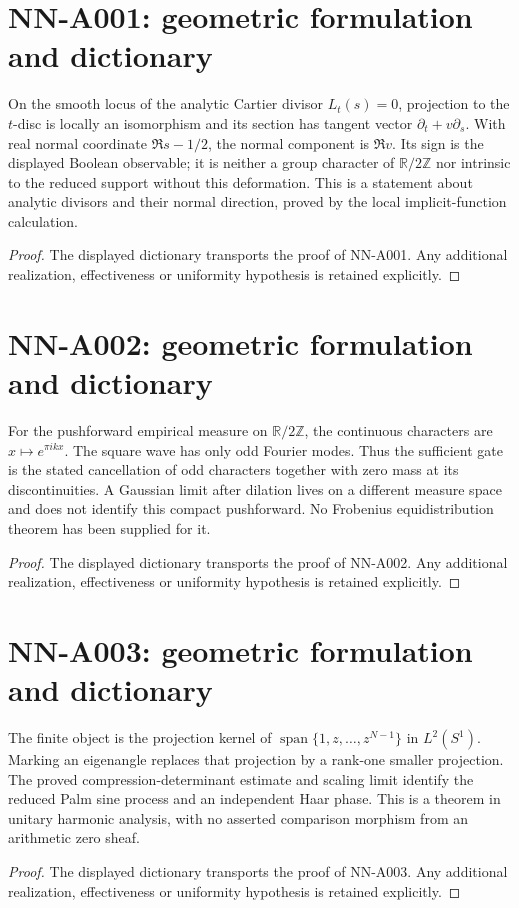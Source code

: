 \section{NN-A001: geometric formulation and dictionary}
\begin{geometricstatement}[NN-A001]
On the smooth locus of the analytic Cartier divisor $L_t(s)=0$, projection to the $t$-disc is locally an isomorphism and its section has tangent vector $\partial_t+v\partial_s$. With real normal coordinate $\Re s-1/2$, the normal component is $\Re v$. Its sign is the displayed Boolean observable; it is neither a group character of $\mathbb R/2\mathbb Z$ nor intrinsic to the reduced support without this deformation. This is a statement about analytic divisors and their normal direction, proved by the local implicit-function calculation.
\end{geometricstatement}
\begin{proof} The displayed dictionary transports the proof of NN-A001. Any additional realization, effectiveness or uniformity hypothesis is retained explicitly.\end{proof}


\section{NN-A002: geometric formulation and dictionary}
\begin{geometricstatement}[NN-A002]
For the pushforward empirical measure on $\mathbb R/2\mathbb Z$, the continuous characters are $x\mapsto e^{\pi ikx}$. The square wave has only odd Fourier modes. Thus the sufficient gate is the stated cancellation of odd characters together with zero mass at its discontinuities. A Gaussian limit after dilation lives on a different measure space and does not identify this compact pushforward. No Frobenius equidistribution theorem has been supplied for it.
\end{geometricstatement}
\begin{proof} The displayed dictionary transports the proof of NN-A002. Any additional realization, effectiveness or uniformity hypothesis is retained explicitly.\end{proof}


\section{NN-A003: geometric formulation and dictionary}
\begin{geometricstatement}[NN-A003]
The finite object is the projection kernel of $\operatorname{span}\{1,z,\ldots,z^{N-1}\}$ in $L^2(S^1)$. Marking an eigenangle replaces that projection by a rank-one smaller projection. The proved compression-determinant estimate and scaling limit identify the reduced Palm sine process and an independent Haar phase. This is a theorem in unitary harmonic analysis, with no asserted comparison morphism from an arithmetic zero sheaf.
\end{geometricstatement}
\begin{proof} The displayed dictionary transports the proof of NN-A003. Any additional realization, effectiveness or uniformity hypothesis is retained explicitly.\end{proof}


